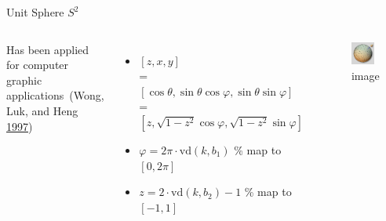 \documentclass[10pt,ignorenonframetext,serif,onlymath]{beamer}
\begin{document}
\begin{frame}{Unit Sphere \(S^2\)}
\protect\hypertarget{unit-sphere-s2}{}

\begin{columns}


Has been applied for computer graphic applications~(Wong, Luk, and Heng
\protect\hyperlink{ref-wong1997sampling}{1997})

\begin{itemize}
\item
  \([z, x, y]\)\\
  = \([\cos\theta, \sin\theta\cos\varphi, \sin\theta\sin\varphi]\)\\
  = \([z, \sqrt{1-z^2}\cos\varphi, \sqrt{1-z^2}\sin\varphi]\)
\item
  \(\varphi = 2\pi\cdot\mathrm{vd}(k,b_1)\) \% map to \([0,2\pi]\)
\item
  \(z = 2\cdot\mathrm{vd}(k,b_2) - 1\) \% map to \([-1,1]\)
\end{itemize}


\begin{figure}
\centering
\includegraphics[width=0.8\textwidth,height=\textheight]{thammer.png}
\caption{image}
\end{figure}

\end{columns}

\end{frame}
\end{document}
